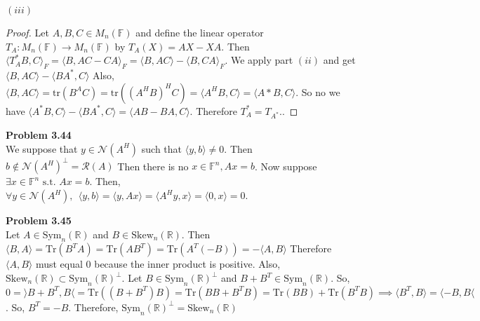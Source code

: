 \documentclass[letterpaper,12pt]{article}
\theoremstyle{definition}
\begin{document}
 \noindent $(iii)$ \begin{proof} Let $A,B,C \in M_n(\mathbb{F})$ and define the linear operator $T_A : M_n(\mathbb{F}) \rightarrow M_n(\mathbb{F})$ by $ T_A(X) = AX - XA$.  Then $\langle T_A^*B, C \rangle_F = \langle B, AC -CA \rangle_F = \langle B, AC\rangle -\langle B, CA \rangle_F$. We apply part $(ii)$ and get $ \langle B, AC \rangle - \langle BA^*, C \rangle$  Also, $ \langle B, AC \rangle = \text{tr}(B^AC) = \text{tr}((A^HB)^HC) = \langle A^HB, C \rangle = \langle A*B, C\rangle$.  So no we have $ \langle A^*B, C \rangle - \langle BA^*, C \rangle = \langle AB - BA, C \rangle$.  Therefore $T_A^* = T_{A^*}.$. \end{proof}
 
 
\vspace{5mm}
\noindent\textbf{Problem 3.44}\\
We suppose that $y \in \mathcal{N}(A^H)$ such that $\langle y, b \rangle \neq 0$.  Then $b \notin \mathcal{N}(A^H)^\perp = \mathcal R(A)$ Then there is no $x \in \mathbb{F}^n, Ax =b$. Now suppose $\exists x \in \mathbb{F}^n \text{ s.t. } Ax=b.$ Then, $\forall y \in \mathcal{N}(A^H), \:\: \langle y, b \rangle = \langle y, Ax \rangle = \langle A^Hy, x\rangle = \langle 0, x \rangle = 0$.
 
 \vspace{5mm}
 \noindent\textbf{Problem 3.45}\\
\noindent Let $A\in\text{Sym}_n(\mathbb R)$ and $B\in\text{Skew}_n(\mathbb R)$.
Then   $\langle B,A \rangle =\text{Tr}(B^TA)=\text{Tr}(AB^T)= \text{Tr}(A^T(-B))=- \langle A,B\rangle$
Therefore $\langle A,B\rangle$ must equal 0 because the inner product is positive. Also, $\text{Skew}_n(\mathbb R)\subset\text{Sym}_n(\mathbb R)^\perp$. Let $B\in\text{Sym}_n(\mathbb R)^\perp$ and $B+B^T\in\text{Sym}_n(\mathbb R)$.
So,$ 0 = \rangle B+B^T,B \langle =\text{Tr}((B+B^T)B) =\text{Tr}(BB + B^TB)=\text{Tr}(BB)+\text{Tr}(B^TB) \implies \langle B^T,B\rangle=\langle -B,B\langle $.  So,  $B^T=-B$.
Therefore, $\text{Sym}_n(\mathbb R)^\perp=\text{Skew}_n(\mathbb R)$\\
 
\end{document}
